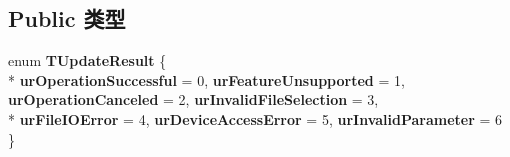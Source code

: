\subsection*{Public 类型}
\begin{DoxyCompactItemize}
\item 
\hypertarget{class_device_handler_a670478ae2f09265bdff3ff12a10102c9}{enum {\bfseries T\+Update\+Result} \{ \\*
{\bfseries ur\+Operation\+Successful} = 0, 
{\bfseries ur\+Feature\+Unsupported} = 1, 
{\bfseries ur\+Operation\+Canceled} = 2, 
{\bfseries ur\+Invalid\+File\+Selection} = 3, 
\\*
{\bfseries ur\+File\+I\+O\+Error} = 4, 
{\bfseries ur\+Device\+Access\+Error} = 5, 
{\bfseries ur\+Invalid\+Parameter} = 6
 \}}\label{class_device_handler_a670478ae2f09265bdff3ff12a10102c9}

\end{DoxyCompactItemize}
